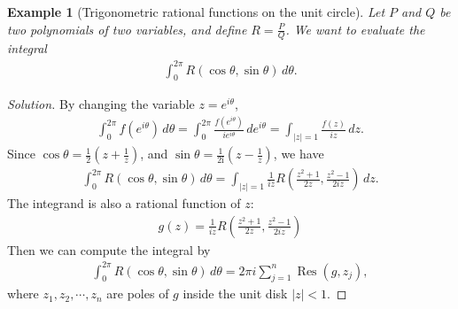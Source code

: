 \documentclass{article}
\numberwithin{equation}{section}
\DeclareMathOperator{\res}{Res}
\renewcommand{\i}{\mathrm{i}}
\theoremstyle{plain}
\newtheorem{example}[theorem]{Example}
\theoremstyle{definition}
\begin{document}
\begin{example}[Trigonometric rational functions on the unit circle] Let $P$ and $Q$ be two polynomials of two variables, and define $R=\frac{P}{Q}$. We want to evaluate the integral
\begin{align*}
	\int_0^{2\pi}R(\cos\theta,\sin\theta)\,d\theta.
\end{align*}
\end{example}
\begin{proof}[Solution]
By changing the variable $z=e^{i\theta}$,
\begin{align*}
\int_0^{2\pi} f(e^{i\theta})\,d\theta=\int_0^{2\pi} \frac{f(e^{i\theta})}{ie^{i\theta}}\,de^{i\theta}=\int_{\vert z\vert=1}\frac{f(z)}{iz}\,dz.
\end{align*}
Since $\cos\theta=\frac{1}{2}\left(z+\frac{1}{z}\right)$, and $\sin\theta=\frac{1}{2\i}\left(z-\frac{1}{z}\right)$, we have
\begin{align*}
	\int_0^{2\pi}R(\cos\theta,\sin\theta)\,d\theta=\int_{\vert z\vert=1}\frac{1}{iz}R\left(\frac{z^2+1}{2z},\frac{z^2-1}{2iz}\right)\,dz.
\end{align*}
The integrand is also a rational function of $z$:
\begin{align*}
	g(z)=\frac{1}{iz}R\left(\frac{z^2+1}{2z},\frac{z^2-1}{2iz}\right)
\end{align*}
Then we can compute the integral by
\begin{align*}
	\int_0^{2\pi}R(\cos\theta,\sin\theta)\,d\theta=2\pi i\sum_{j=1}^n\res(g,z_j),
\end{align*}
where $z_1,z_2,\cdots,z_n$ are poles of $g$ inside the unit disk $\vert z\vert<1$. 
\end{proof}
\end{document}
